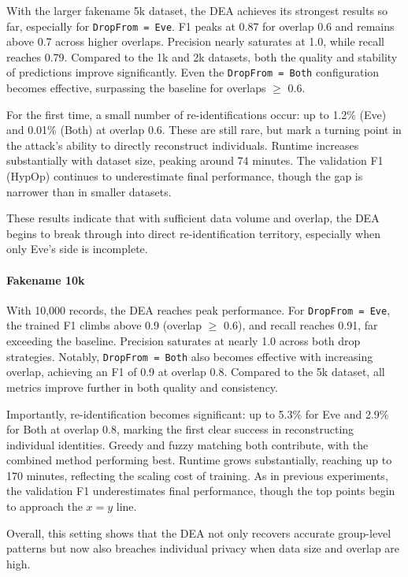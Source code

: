 With the larger fakename 5k dataset, the DEA achieves its strongest results so far, especially for \texttt{DropFrom = Eve}.
F1 peaks at 0.87 for overlap 0.6 and remains above 0.7 across higher overlaps.
Precision nearly saturates at 1.0, while recall reaches 0.79.
Compared to the 1k and 2k datasets, both the quality and stability of predictions improve significantly.
Even the \texttt{DropFrom = Both} configuration becomes effective, surpassing the baseline for overlaps $\geq$ 0.6.

For the first time, a small number of re-identifications occur: up to 1.2\% (Eve) and 0.01\% (Both) at overlap 0.6.
These are still rare, but mark a turning point in the attack’s ability to directly reconstruct individuals.
Runtime increases substantially with dataset size, peaking around 74 minutes.
The validation F1 (HypOp) continues to underestimate final performance, though the gap is narrower than in smaller datasets.

These results indicate that with sufficient data volume and overlap, the DEA begins to break through into direct re-identification territory, especially when only Eve’s side is incomplete.

\paragraph{Fakename 10k}
With 10{,}000 records, the DEA reaches peak performance.
For \texttt{DropFrom = Eve}, the trained F1 climbs above 0.9 (overlap $\geq$ 0.6), and recall reaches 0.91, far exceeding the baseline.
Precision saturates at nearly 1.0 across both drop strategies.
Notably, \texttt{DropFrom = Both} also becomes effective with increasing overlap, achieving an F1 of 0.9 at overlap 0.8.
Compared to the 5k dataset, all metrics improve further in both quality and consistency.

Importantly, re-identification becomes significant: up to 5.3\% for Eve and 2.9\% for Both at overlap 0.8, marking the first clear success in reconstructing individual identities.
Greedy and fuzzy matching both contribute, with the combined method performing best.
Runtime grows substantially, reaching up to 170 minutes, reflecting the scaling cost of training.
As in previous experiments, the validation F1 underestimates final performance, though the top points begin to approach the $x = y$ line.

Overall, this setting shows that the DEA not only recovers accurate group-level patterns but now also breaches individual privacy when data size and overlap are high.

